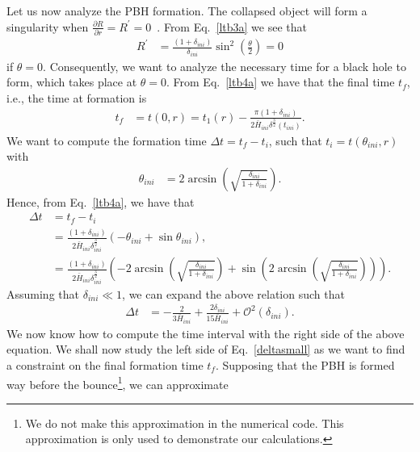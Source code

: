 \documentclass[a4paper,11pt]{article}
\begin{document}
Let us now analyze the PBH formation. The collapsed object will form a singularity when
$\frac{\partial R}{\partial r} = {R}^\prime = 0$~\cite{Dey2023}. From Eq.~\eqref{ltb3a}
we see that
\begin{align}
	{R}^\prime & = \frac{ (1+\delta_{ini})}{\delta_{ini}}\sin^2\left(\frac{\theta}{2}\right) = 0
\end{align}
if $\theta = 0$. Consequently, we want to analyze the necessary time for a black hole to
form, which takes place at $\theta = 0$. From Eq.~\eqref{ltb4a} we have that the final
time $t_f$, i.e., the time at formation is
\begin{align}
	t_f & = t(0,r ) =t_1(r) - \frac{\pi(1 + \delta_{ini})}{2\bar{H}_{ini}\delta^{\frac{3}{2}}(t_{ini})}
	.\end{align}
We want to compute the formation time $\Delta t = t_f - t_i$, such that $t_i =
	t(\theta_{ini}, r)$ with
\begin{align}
	\theta_{ini} & = 2\arcsin(\sqrt{\frac{\delta_{ini}}{1+\delta_{ini}}})
	.\end{align}
Hence, from Eq.~\eqref{ltb4a}, we have that
\begin{align}
	\label{criticallinear}
	\Delta t & = t_f - t_i \nonumber                                                                                                                                                                                 \\
	         & =\frac{(1 + \delta_{ini})}{2\bar{H}_{ini}\delta^{\frac{3}{2}}_{ini} } \left(  -\theta_{ini} +\sin{\theta_{ini}}\right) ,\nonumber                                                                     \\
	         & =\frac{(1 + \delta_{ini})}{2\bar{H}_{ini}\delta^{\frac{3}{2}}_{ini} } \left( -2\arcsin(\sqrt{\frac{\delta_{ini}}{1+\delta_{ini}}}) +\sin(2\arcsin(\sqrt{\frac{\delta_{ini}}{1+\delta_{ini}}}))\right)
	.\end{align}
Assuming that $\delta_{ini} \ll 1$, we can expand the above relation such that
\begin{align}
	\label{deltasmall}
	\Delta t & = -\frac{2}{3\bar{H}_{ini}}+\frac{2\delta_{ini}}{15\bar{H}_{ini}} + \mathcal{O}^2(\delta_{ini})
	.\end{align}
We now know how to compute the time interval with the right side of the above equation.
We shall now study the left side of Eq.~\eqref{deltasmall} as we want to find a
constraint on the final formation time $t_f$. Supposing that the PBH is formed way
before the bounce\footnote{We do not make this approximation in the numerical code. This
	approximation is only used to demonstrate our calculations.}, we can approximate
\end{document}
